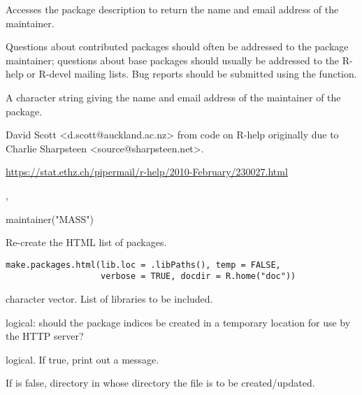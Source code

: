 %
\begin{Details}\relax
Accesses the package description to return the name and email address of
the maintainer.  

Questions about contributed packages should often be addressed to
the package maintainer; questions about base packages should
usually be addressed to the R-help or R-devel mailing lists.  Bug
reports should be submitted using the 
function.
\end{Details}
%
\begin{Value}
A character string giving the name and email address of the maintainer
of the package.
\end{Value}
%
\begin{Author}\relax
David Scott <d.scott@auckland.ac.nz> from code on R-help originally
due to Charlie Sharpsteen <source@sharpsteen.net>.
\end{Author}
%
\begin{References}\relax
\url{https://stat.ethz.ch/pipermail/r-help/2010-February/230027.html}
\end{References}
%
\begin{SeeAlso}\relax
{}, 
\end{SeeAlso}
%
\begin{Examples}
\begin{ExampleCode}
maintainer("MASS")
\end{ExampleCode}
\end{Examples}
%
\begin{Description}\relax
Re-create the HTML list of packages.
\end{Description}
%
\begin{Usage}
\begin{verbatim}
make.packages.html(lib.loc = .libPaths(), temp = FALSE,
                   verbose = TRUE, docdir = R.home("doc"))
\end{verbatim}
\end{Usage}
%
\begin{Arguments}
\begin{ldescription}
\item[\code{lib.loc}] character vector.  List of libraries to be included.
\item[\code{temp}] logical: should the package indices be created in a
temporary location for use by the HTTP server?
\item[\code{verbose}] logical.  If true, print out a message.

\item[\code{docdir}] If  is false, directory in whose 
directory the  file is to be created/updated.
\end{ldescription}
\end{Arguments}
